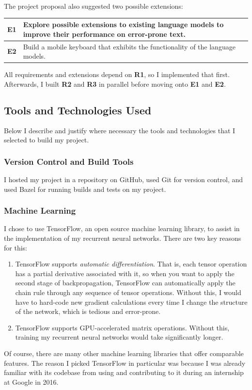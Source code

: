 \documentclass[a4paper, 12pt]{report}
\newcommand{\tbf}[1]{\textbf{#1}}
\newcommand{\tit}[1]{\textit{#1}}
\begin{document}
The project proposal also suggested two possible extensions:
\begin{center}
\begin{tabular}{L{1cm} L{14cm}}
	\hline
	\tbf{E1} & Explore possible extensions to existing language models to improve their performance on error-prone text. \\ \hline
	\tbf{E2} & Build a mobile keyboard that exhibits the functionality of the language models. \\ \hline
\end{tabular}
\end{center}

All requirements and extensions depend on \tbf{R1}, so I implemented that first. Afterwards, I built \tbf{R2} and \tbf{R3} in parallel before moving onto \tbf{E1} and \tbf{E2}.

\subsection{Tools and Technologies Used} \label{tools}

Below I describe and justify where necessary the tools and technologies that I selected to build my project.

\subsubsection{Version Control and Build Tools}

I hosted my project in a repository on GitHub, used Git for version control, and used Bazel for running builds and tests on my project.

\subsubsection{Machine Learning}

I chose to use TensorFlow, an open source machine learning library, to assist in the implementation of my recurrent neural networks. There are two key reasons for this:
\begin{enumerate}
\item
	TensorFlow supports \tit{automatic differentiation}. That is, each tensor operation has a partial derivative associated with it, so when you want to apply the second stage of backpropagation, TensorFlow can automatically apply the chain rule through any sequence of tensor operations. Without this, I would have to hard-code new gradient calculations every time I change the structure of the network, which is tedious and error-prone.
\item
	TensorFlow supports GPU-accelerated matrix operations. Without this, training my recurrent neural networks would take significantly longer.
\end{enumerate}
Of course, there are many other machine learning libraries that offer comparable features. The reason I picked TensorFlow in particular was because I was already familiar with its codebase from using and contributing to it during an internship at Google in 2016. \\
\end{document}
